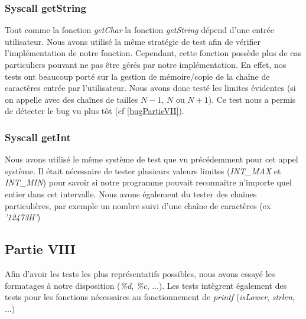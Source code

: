 \documentclass{article}
\begin{document}
\subsubsection{Syscall getString}
Tout comme la fonction \textit{getChar} la fonction \textit{getString} dépend
d'une entrée utilisateur. Nous avons utilisé la même stratégie de test afin de
vérifier l'implémentation de notre fonction. Cependant, cette fonction possède
plus de cas particuliers pouvant ne pas être gérés par notre implémentation. En
effet, nos tests ont beaucoup porté sur la gestion de mémoire/copie de la
chaîne de caractères entrée par l'utilisateur. Nous avons donc testé les
limites évidentes (si on appelle avec des chaînes de tailles $N-1$, $N$ ou
$N+1$). Ce test nous a permis de détecter le bug vu plus tôt (cf
\ref{bugPartieVII}).
\subsubsection{Syscall getInt}
Nous avons utilisé le même système de test que vu précédemment pour cet appel système.
Il était nécessaire de tester plusieurs valeurs limites (\textit{INT\_MAX} et \textit{INT\_MIN}) pour
savoir si notre programme pouvait reconnaitre n'importe quel entier dans cet intervalle. Nous avons également
du tester des chaines particulières, par exemple un nombre suivi d'une chaîne de caractères (ex \textit{'12473H'})

\subsection{Partie VIII}
Afin d'avoir les tests les plus représentatifs possibles, nous avons essayé les formatages à notre disposition (\textit{\%d}, \textit{\%c}, ...).
Les tests intègrent également des tests pour les fonctions nécessaires au fonctionnement de \textit{printf} (\textit{isLower}, \textit{strlen}, ...)
\end{document}
